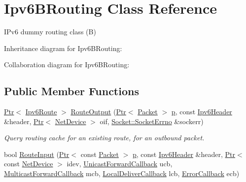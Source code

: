 \hypertarget{classIpv6BRouting}{}\section{Ipv6\+B\+Routing Class Reference}
\label{classIpv6BRouting}


I\+Pv6 dummy routing class (B)  




Inheritance diagram for Ipv6\+B\+Routing\+:


Collaboration diagram for Ipv6\+B\+Routing\+:
\subsection*{Public Member Functions}
\begin{DoxyCompactItemize}
\item 
\hyperlink{classns3_1_1Ptr}{Ptr}$<$ \hyperlink{classns3_1_1Ipv6Route}{Ipv6\+Route} $>$ \hyperlink{classIpv6BRouting_ab9014aef2ea98c6231436e9f4c906b80}{Route\+Output} (\hyperlink{classns3_1_1Ptr}{Ptr}$<$ \hyperlink{classns3_1_1Packet}{Packet} $>$ \hyperlink{lte__link__budget__x2__handover__measures_8m_ac9de518908a968428863f829398a4e62}{p}, const \hyperlink{classns3_1_1Ipv6Header}{Ipv6\+Header} \&header, \hyperlink{classns3_1_1Ptr}{Ptr}$<$ \hyperlink{classns3_1_1NetDevice}{Net\+Device} $>$ oif, \hyperlink{classns3_1_1Socket_ada1328c5ae0c28cb2a982caf8f6d6cca}{Socket\+::\+Socket\+Errno} \&sockerr)
\begin{DoxyCompactList}\small\item\em Query routing cache for an existing route, for an outbound packet. \end{DoxyCompactList}\item 
bool \hyperlink{classIpv6BRouting_a5983fb97e371e496d202af629cb813c2}{Route\+Input} (\hyperlink{classns3_1_1Ptr}{Ptr}$<$ const \hyperlink{classns3_1_1Packet}{Packet} $>$ \hyperlink{lte__link__budget__x2__handover__measures_8m_ac9de518908a968428863f829398a4e62}{p}, const \hyperlink{classns3_1_1Ipv6Header}{Ipv6\+Header} \&header, \hyperlink{classns3_1_1Ptr}{Ptr}$<$ const \hyperlink{classns3_1_1NetDevice}{Net\+Device} $>$ idev, \hyperlink{classns3_1_1Ipv6RoutingProtocol_a579fd6755ee873009819f7117371fea7}{Unicast\+Forward\+Callback} ucb, \hyperlink{classns3_1_1Ipv6RoutingProtocol_a5f12e04512ce8e5808c3cceff6b8918f}{Multicast\+Forward\+Callback} mcb, \hyperlink{classns3_1_1Ipv6RoutingProtocol_a93f6c06be1e024747e95f4299eba74a6}{Local\+Deliver\+Callback} lcb, \hyperlink{classns3_1_1Ipv6RoutingProtocol_abfdf43594e2ae97e1a4dc340e3a086a5}{Error\+Callback} ecb)

\end{DoxyCompactItemize}
